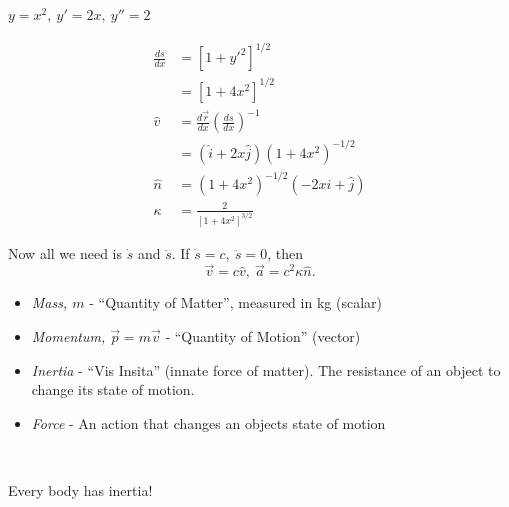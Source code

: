 \documentclass[10pt]{scrartcl}
\begin{document}
\begin{example}
$y = x^2,~y' = 2x,~ y'' = 2$

\[\begin{aligned}
\frac{ds}{dx} &= [1 + y'^2]^{1/2}\\	
&= [1 + 4x^2]^{1/2}\\[0.5cm]
\hat{v} &= \frac{d\vec{r}}{dx}\left(\frac{ds}{dx}\right)^{-1}\\
&= (\hat{i} + 2x\hat{j})(1 + 4x^2)^{-1/2}\\[0.5cm]
\hat{n} &= (1 + 4x^2)^{-1/2}(-2x\hat{i} + \hat{j})\\
\kappa &= \frac{2}{[1+4x^2]^{3/2}}
\end{aligned}
\]	

Now all we need is $\dot{s}$ and $\ddot{s}$. If $\dot{s} =c,~\ddot{s} = 0$, then
\[\vec{v} = c\hat{v},~ \vec{a} = c^2\kappa\hat{n}.\]
\end{example}

\vsp


\begin{definition}
\begin{itemize}

\item \emph{Mass, $m$} - ``Quantity of Matter'', measured in kg (scalar)

\item \emph{Momentum, $\vec{p} = m\vec{v}$} - ``Quantity of Motion'' (vector)

\item \emph{Inertia} - ``Vis Insita'' (innate force of matter). The resistance of an object to change its state of motion.

\item \emph{Force} - An action that changes an objects state of motion
\end{itemize}
\end{definition}~

\begin{theorem}
Every body has inertia! 	
\end{theorem}
\end{document}

